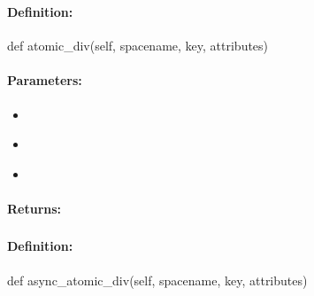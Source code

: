 \subsubsection{}
\label{api:python:atomic_div}


\paragraph{Definition:}
\begin{pythoncode}
def atomic_div(self, spacename, key, attributes)
\end{pythoncode}

\paragraph{Parameters:}
\begin{itemize}[noitemsep]
\item {}\\

\item {}\\

\item {}\\

\end{itemize}

\paragraph{Returns:}


\pagebreak
\subsubsection{}
\label{api:python:async_atomic_div}


\paragraph{Definition:}
\begin{pythoncode}
def async_atomic_div(self, spacename, key, attributes)
\end{pythoncode}

